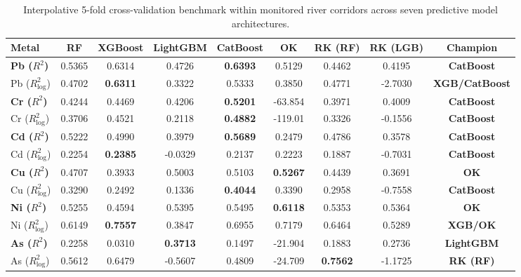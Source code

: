 \documentclass[authoryear,preprint,12pt]{elsarticle}
\begin{document}
\begin{table}[htbp]
\centering
\small
\caption{Interpolative 5-fold cross-validation benchmark within monitored river corridors across seven predictive model architectures.}
\label{tab:benchmark}
\begin{tabularx}{\textwidth}{lcccccccc}
\toprule
Metal & RF & XGBoost & LightGBM & \textbf{CatBoost} & OK & RK (RF) & RK (LGB) & Champion \\
\midrule
\textbf{Pb ($R^2$)} & 0.5365 & 0.6314 & 0.4726 & \textbf{0.6393} & 0.5129 & 0.4462 & 0.4195 & \textbf{CatBoost} \\
Pb ($R^2_{\log}$) & 0.4702 & \textbf{0.6311} & 0.3322 & 0.5333 & 0.3850 & 0.4771 & -2.7030 & \textbf{XGB/CatBoost} \\
\textbf{Cr ($R^2$)} & 0.4244 & 0.4469 & 0.4206 & \textbf{0.5201} & -63.854 & 0.3971 & 0.4009 & \textbf{CatBoost} \\
Cr ($R^2_{\log}$) & 0.3706 & 0.4521 & 0.2118 & \textbf{0.4882} & -119.01 & 0.3326 & -0.1556 & \textbf{CatBoost} \\
\textbf{Cd ($R^2$)} & 0.5222 & 0.4990 & 0.3979 & \textbf{0.5689} & 0.2479 & 0.4786 & 0.3578 & \textbf{CatBoost} \\
Cd ($R^2_{\log}$) & 0.2254 & \textbf{0.2385} & -0.0329 & 0.2137 & 0.2223 & 0.1887 & -0.7031 & \textbf{CatBoost} \\
\textbf{Cu ($R^2$)} & 0.4707 & 0.3933 & 0.5003 & 0.5103 & \textbf{0.5267} & 0.4439 & 0.3691 & \textbf{OK} \\
Cu ($R^2_{\log}$) & 0.3290 & 0.2492 & 0.1336 & \textbf{0.4044} & 0.3390 & 0.2958 & -0.7558 & \textbf{CatBoost} \\
\textbf{Ni ($R^2$)} & 0.5255 & 0.4594 & 0.5395 & 0.5495 & \textbf{0.6118} & 0.5353 & 0.5364 & \textbf{OK} \\
Ni ($R^2_{\log}$) & 0.6149 & \textbf{0.7557} & 0.3847 & 0.6955 & 0.7179 & 0.6464 & 0.5289 & \textbf{XGB/OK} \\
\textbf{As ($R^2$)} & 0.2258 & 0.0310 & \textbf{0.3713} & 0.1497 & -21.904 & 0.1883 & 0.2736 & \textbf{LightGBM} \\
As ($R^2_{\log}$) & 0.5612 & 0.6479 & -0.5607 & 0.4809 & -24.709 & \textbf{0.7562} & -1.1725 & \textbf{RK (RF)} \\
\bottomrule
\end{tabularx}
\end{table}
\end{document}
